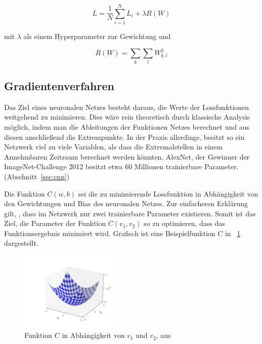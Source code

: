 \begin{equation}
\label{eqn:def_loss}
L = \frac{1}{N}\sum_{i=1}^{N}L_i + \lambda R(W)
\end{equation}

mit $\lambda$ als einem Hyperparameter zur Gewichtung und

\begin{equation}
R(W) = \sum_k\sum_l W^2_{k,l}
\end{equation}

\subsection{Gradientenverfahren}
\label{ssec:gradientenverfahren}

Das Ziel eines neuronalen Netzes besteht daraus, die Werte der Lossfunktionen weitgehend zu minimieren. Dies wäre rein theoretisch durch klassische Analysis möglich, indem man die Ableitungen der Funktionen Netzes berechnet und aus diesen anschließend die Extrempunkte. In der Praxis allerdings, besitzt so ein Netzwerk viel zu viele Variablen, als dass die Extremalstellen in einem Annehmbaren Zeitraum berechnet werden könnten. \cite[Kap.~1]{nielsen_15} AlexNet, der Gewinner der ImageNet-Challenge 2012 besitzt \bspw etwa 60 Millionen trainierbare Parameter. (\Vgl Abschnitt~\ref{sec:cnn})

Die Funktion $C(w, b)$ sei die zu minimierende Lossfunktion in Abhängigkeit von den Gewichtungen und Bias des neuronalen Netzes. Zur einfacheren Erklärung gilt, \oBdA, dass im Netzwerk nur zwei trainierbare Parameter existieren. Somit ist das Ziel, die Parameter der Funktion $C(v_1, v_2)$ so zu optimieren, dass das Funktionsergebnis minimiert wird. Grafisch ist eine Beispielfunktion $C$ in \figurename~\ref{fig:valley} dargestellt.

\begin{figure}[h!]
	\centering
	\includegraphics[width=0.45\textwidth,keepaspectratio]{images/Nie15_01.png}
	\caption{Funktion $C$ in Abhängigkeit von $v_1$ und $v_2$, aus \cite[Kap.~1]{nielsen_15}}
	\label{fig:valley}
\end{figure}

